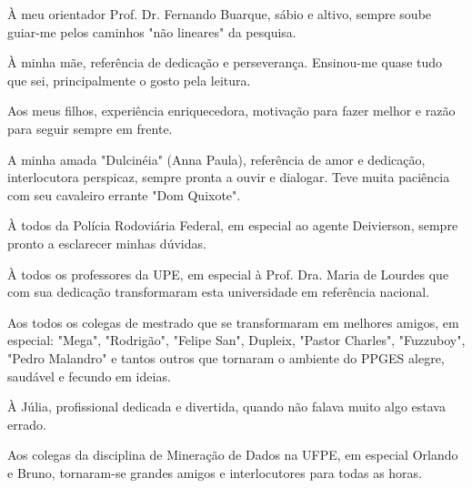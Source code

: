 À meu orientador Prof. Dr. Fernando Buarque, sábio e altivo, sempre soube guiar-me pelos caminhos "não lineares" da pesquisa.

À minha mãe, referência de dedicação e perseverança. Ensinou-me quase tudo que sei, principalmente o gosto pela leitura.

Aos meus filhos, experiência enriquecedora, motivação para fazer melhor e razão para seguir sempre em frente.

A minha amada "Dulcinéia" (Anna Paula), referência de amor e dedicação, interlocutora perspicaz, sempre pronta a ouvir e dialogar. Teve muita paciência com seu cavaleiro errante "Dom Quixote".

À todos da Polícia Rodoviária Federal, em especial ao agente Deivierson,  sempre pronto a esclarecer minhas dúvidas.

À todos os professores da UPE, em especial à Prof. Dra. Maria de Lourdes que com sua dedicação transformaram esta universidade em referência nacional.

Aos todos os colegas de mestrado que se transformaram em melhores amigos, em especial: "Mega", "Rodrigão", "Felipe San", Dupleix, "Pastor Charles", "Fuzzuboy", "Pedro Malandro" e tantos outros que tornaram o ambiente do PPGES alegre, saudável e fecundo em ideias.

À Júlia, profissional dedicada e divertida, quando não falava muito algo estava errado.

Aos colegas da disciplina de Mineração de Dados na UFPE, em especial Orlando e Bruno, tornaram-se grandes amigos e interlocutores para todas as horas.

